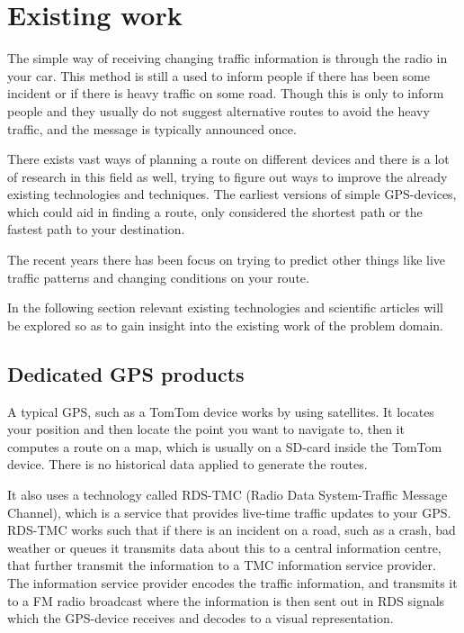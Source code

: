 \section{Existing work}
The simple way of receiving changing traffic information is through the radio in your car. This method is still a used to inform people if there has been some incident or if there is heavy traffic on some road. Though this is only to inform people and they usually do not suggest alternative routes to avoid the heavy traffic, and the message is typically announced once.  

There exists vast ways of planning a route on different devices and there is  a lot of research in this field as well, trying to figure out ways to improve the already existing technologies and techniques. The earliest versions of simple GPS-devices, which could aid in finding a route, only considered the shortest path or the fastest path to your destination.

The recent years there has been focus on trying to predict other things like live traffic patterns and changing conditions on your route.

In the following section relevant existing technologies and scientific articles will be explored so as to gain insight into the existing work of the problem domain.

\subsection*{Dedicated GPS products}
A typical GPS, such as a TomTom device works by using satellites. It locates your position and then locate the point you want to navigate to, then it computes a route on a map, which is usually on a SD-card inside the TomTom device. There is no historical data applied to generate the routes.

It also uses a technology called RDS-TMC (Radio Data System-Traffic Message Channel), which is a service that provides live-time traffic updates to your GPS. RDS-TMC works such that if there is an incident on a road, such as a crash, bad weather or queues it transmits data about this to a central information centre, that further transmit the information to a TMC information service provider. The information service provider encodes the traffic information, and transmits it to a FM radio broadcast where the information is then sent out in RDS signals which the GPS-device receives and decodes to a visual representation.

